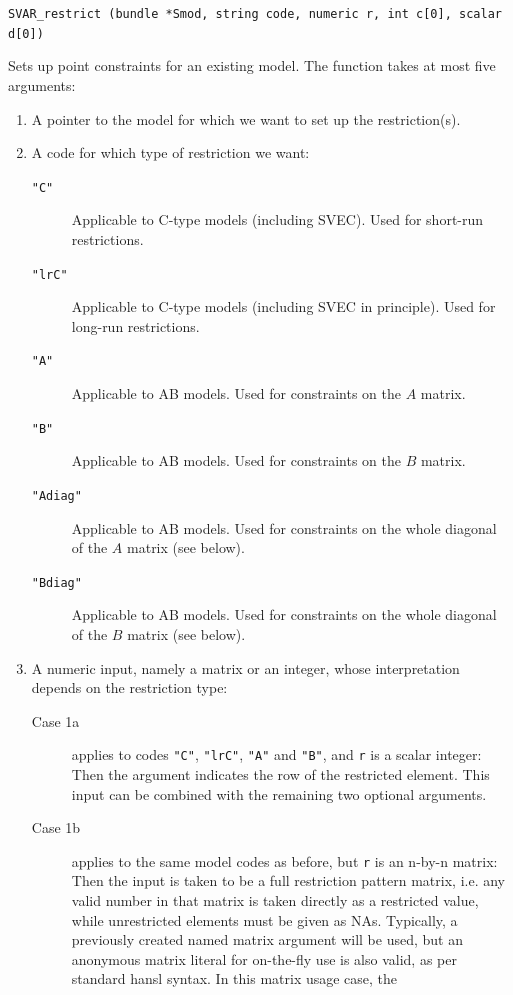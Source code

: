 \documentclass[a4paper,10pt]{article}
\newenvironment{funcdoc}[1]
{\noindent\hrulefill\newline\nopagebreak\texttt{#1}%
\nopagebreak\par\noindent\hrulefill%
\nopagebreak\par\nopagebreak\smallskip\nopagebreak\par}
{\bigskip}
\newcounter{script}[section]
\begin{document}
\begin{funcdoc}{SVAR\_restrict (bundle *Smod, string code, numeric r, int c[0], scalar d[0])}
  \noindent Sets up point constraints for an existing model. The function
  takes at most five arguments:
\begin{enumerate}
\item A pointer to the model for which we want to set up the
  restriction(s).
\item A code for which type of restriction we want: 
  \begin{description}
  \item[\texttt{"C"}] Applicable to C-type models (including SVEC). Used for short-run
    restrictions.
  \item[\texttt{"lrC"}] Applicable to C-type models (including SVEC in principle). 
    Used for long-run restrictions.
  \item[\texttt{"A"}] Applicable to AB models. Used for constraints on
    the $A$ matrix.
  \item[\texttt{"B"}] Applicable to AB models. Used for constraints on
    the $B$ matrix.
  \item[\texttt{"Adiag"}] Applicable to AB models. Used for constraints on
    the whole diagonal of the $A$ matrix (see below).
  \item[\texttt{"Bdiag"}] Applicable to AB models. Used for constraints on
    the whole diagonal of the $B$ matrix (see below).
  \end{description}
\item A numeric input, namely a matrix or an integer, whose interpretation depends
 on the restriction type:
  \begin{description}
  \item[Case 1a] applies to codes \texttt{"C"}, \texttt{"lrC"},
    \texttt{"A"} and \texttt{"B"}, and \texttt{r} is a scalar integer: Then the
    argument indicates the row of the restricted element. This input can be combined
    with the remaining two optional arguments.
  \item[Case 1b] applies to the same model codes as before, but \texttt{r} is an
    n-by-n matrix: Then the input is taken to be a full restriction pattern matrix,
    i.e. any valid number in that matrix is taken directly as a restricted value, 
    while unrestricted elements must be given as NAs. Typically, a previously created
    named matrix argument will be used, but an anonymous matrix literal for on-the-fly
    use is also valid, as per standard hansl syntax. In this matrix usage case, the 

\end{description}
\end{enumerate}
\end{funcdoc}
\end{document}

